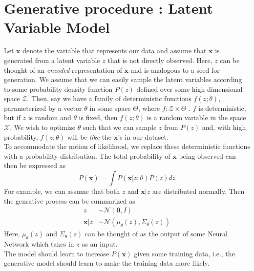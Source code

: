 \documentclass[12pt]{article}
\begin{document}
\section{Generative procedure : Latent Variable Model}
Let $\mathbf{x}$ denote the variable that represents our data and assume that $\mathbf{x}$ is generated from a latent variable $z$ that is not directly observed. Here, $z$ can be thought of an \textit{encoded} representation of $\mathbf{x}$ and is analogous to a seed for generation. We assume that we can easily sample the latent variables according to some probability density function $P(z)$ defined over some high dimensional space $\mathcal{Z}$. Then, say we have a family of deterministic functions $f(z; \theta)$, parameterized
by a vector $\theta$ in some space $\Theta$, where $f : \mathcal{Z} \times \Theta$ . $f$ is deterministic, but
if $z$ is random and $\theta$ is fixed, then $f(z; \theta)$ is a random variable in the space $\mathcal{X}$. We wish to optimize $\theta$ such that we can sample $z$ from $P(z)$ and, with
high probability, $f(z; \theta)$ will be \textit{like} the $\mathbf{x}$’s in our dataset.\\
To accommodate the notion of likelihood, we replace these deterministic functions with a probability distribution. The total probability of $\mathbf{x}$ being observed can then be expressed as 
\begin{equation*}
    P(\mathbf{x}) = \int{P(\mathbf{x}|z; \theta)P(z)dz}
\end{equation*}
For example, we can assume that both $z$ and $\mathbf{x}|z$ are distributed normally. Then the genrative process can be summarized as 
\begin{align*}
    z &\sim \mathcal{N}(\mathbf{0}, I)\\
    \mathbf{x}|z &\sim \mathcal{N}(\mu_{\theta}(z), \Sigma_{\theta}(z))
\end{align*}
Here, $\mu_{\theta}(z)$ and $\Sigma_{\theta}(z)$ can be thought of as the output of some Neural Network which takes in $z$ as an input. \\
The model should learn to increase $P(\mathbf{x})$ given some training data, i.e., the generative model should learn to make the training data more likely. 
\end{document}
